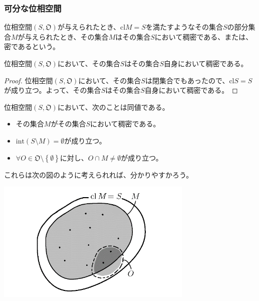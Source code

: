 \documentclass[dvipdfmx]{jsarticle}
\begin{document}
\subsubsection{可分な位相空間}%
\begin{dfn}
位相空間$\left( S,\mathfrak{O} \right)$が与えられたとき、${\mathrm{cl}}M = S$を満たすようなその集合$S$の部分集合$M$が与えられたとき、その集合$M$はその集合$S$において稠密である、または、密であるという。
\end{dfn}
\begin{thm}\label{8.1.2.18}
位相空間$\left( S,\mathfrak{O} \right)$において、その集合$S$はその集合$S$自身において稠密である。
\end{thm}
\begin{proof}
位相空間$\left( S,\mathfrak{O} \right)$において、その集合$S$は閉集合でもあったので、${\mathrm{cl}}S = S$が成り立つ。よって、その集合$S$はその集合$S$自身において稠密である。
\end{proof}
\begin{thm}\label{8.1.2.19}
位相空間$\left( S,\mathfrak{O} \right)$において、次のことは同値である。
\begin{itemize}
\item
  その集合$M$がその集合$S$において稠密である。
\item
  ${\mathrm{int}}(S \setminus M) = \emptyset$が成り立つ。
\item
  $\forall O \in \mathfrak{O \setminus}\left\{ \emptyset \right\}$に対し、$O \cap M \neq \emptyset$が成り立つ。
\end{itemize}
\end{thm}\par
これらは次の図のように考えられれば、分かりやすかろう。
\begin{center}
  \includegraphics[width=94mm]{8.1.2.a.PNG}
\end{center}
\end{document}
